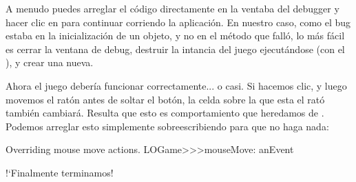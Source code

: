 \documentclass[a4paper,10pt,twoside]{book}
\begin{document}
A menudo puedes arreglar el c\'odigo directamente en la ventaba del debugger y hacer clic en  para continuar corriendo la aplicaci\'on.
En nuestro caso, como el bug estaba en la inicializaci\'on de un objeto, y no en el m\'etodo que fall\'o, lo m\'as f\'acil
es cerrar la ventana de debug, destruir la intancia del juego ejecut\'andose (con el ), y crear una nueva.



Ahora el juego deber\'ia funcionar correctamente... o casi. Si hacemos clic, y luego movemos el rat\'on antes de soltar el bot\'on, la celda sobre la que esta el rat\'o tambi\'en cambiar\'a. Resulta que esto es comportamiento que heredamos de . Podemos arreglar esto simplemente sobreescribiendo  para que no haga nada:

\begin{method}[mouseMove:]{Overriding mouse move actions.}
LOGame>>>mouseMove: anEvent
\end{method}

!`Finalmente terminamos!

\end{document}
